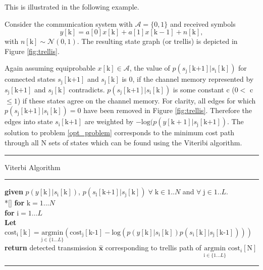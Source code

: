 This is illustrated in the following example. 
   \par
   Consider the communication system with $\mathcal{A}=\{0, 1\}$ and received symbols 
   \begin{equation*}
y[\text{k}] =  a[\text{0}]x[\text{k}] + a[\text{1}]x[\text{k}-1] + n[\text{k}],
\end{equation*}
with $n[\text{k}] \sim \mathcal{N}(0,1)$.
The resulting state graph (or trellis) is depicted in Figure \ref{fig:trellis}. 

Again assuming equiprobable 
$x[\text{k}] \in \mathcal{A}$, the value of $p(s_{\text{j}}[\text{k+1}]|s_{\text{i}}[\text{k}])$ for connected states $s_{\text{j}}[\text{k+1}]$ and $s_{\text{j}}[\text{k}]$ is  0, if the channel memory represented by $s_{\text{j}}[\text{k+1}]$ and $s_{\text{j}}[\text{k}]$ contradicts. $p(s_{\text{j}}[\text{k+1}]|s_{\text{i}}[\text{k}])$  is some constant c ($0<$ c $\leq1$) if these states agree on the channel memory. For clarity, all edges for which $p(s_{\text{j}}[\text{k+1}]|s_{\text{i}}[\text{k}])=0$ have been removed in Figure \ref{fig:trellis}. Therefore the edges into state $s_{\text{i}}[\text{k+1}]$ are weighted by
$-\text{log}(p(y[\text{k}+1]|s_{\text{j}}[\text{k+1}])$. The solution to problem \ref{opt_problem} corresponds to the minimum cost path through all N sets of states which can be found using the Viteribi algorithm. 
\\

    \noindent\rule[16pt]{\textwidth}{0.6pt}
	Viterbi Algorithm

    \noindent\rule[10pt]{\textwidth}{0.4pt}
    {\footnotesize
    \begin{tabbing}
        {\bf given} $p(y[\text{k}]|s_{\text{i}}[\text{k}])$, $p(s_{\text{l}}[\text{k+1}]|s_{\text{j}}[\text{k}]) \; \forall  \; \text{k} \in {1..N}$ and $ \forall \; \text{j} \in {1..L}$. \\*[\smallskipamount]
        {\textbf{for}  $\text{k} = 1... N $} \\
         \qquad \= {\textbf{for} $\text{i} = 1... L$}\\
        \qquad \qquad \= \textbf{Let} $\text{cost}_{\text{i}}[\text{k}] = \underset{\text{j} \in \{1...L\}} {\text{argmin}}\left( \text{cost}_{\text{j}}[\text{k-1}]
        -\text{log}(p(y[\text{k}]|s_{\text{i}}[\text{k}])p(s_{\text{i}}[\text{k}]|s_{\text{j}}[\text{k-1}]))
        \right)$ \\
        {\bf return} detected transmission $\hat{\mathbf{x}}$ corresponding to trellis path of $\underset{\text{i} \in \{1...L\}} {\text{argmin}} \; \text{cost}_{i}[\text{N}] $
    \end{tabbing}}
    \noindent\rule[10pt]{\textwidth}{0.4pt}





